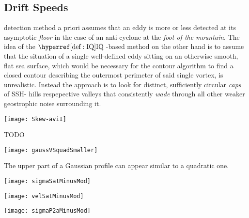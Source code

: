 \subsection{Drift Speeds}

 \MI detection method a priori assumes that an eddy is more or less detected at its asymptotic \textit{floor} \ie in the case of an anti-cyclone at the \textit{foot of the mountain}. The idea of the $\IQ$-based method on the other hand is to assume that the situation of a single well-defined eddy sitting on an otherwise smooth, flat sea surface, which would be necessary for the contour algorithm to find a closed contour describing the outermost perimeter of said single vortex, is unrealistic. Instead the approach is to look for distinct, sufficiently circular \textit{caps} of SSH- hills respepective valleys that consistently \textit{wade} through all other weaker geostrophic noise surrounding it. 


\begin{marginfigure}
		\texttt{[image: Skew-aviI]}
		\caption{TODO}
		\label{fig:SkewAviI}
\end{marginfigure}

\begin{marginfigure}
\texttt{[image: gaussVSquadSmaller]}
\caption{The upper part of a Gaussian profile can appear similar to a quadratic one.}
\label{fig:gaussVSquad}
\end{marginfigure}

\begin{marginfigure}
	\texttt{[image: sigmaSatMinusMod]}
	\caption{}
	\label{fig:TODO}
\end{marginfigure}
\begin{marginfigure}
	\texttt{[image: velSatMinusMod]}
	\caption{}
	\label{fig:TODO}
\end{marginfigure}
\begin{marginfigure}
	\texttt{[image: sigmaP2aMinusMod]}
	\caption{}
	\label{fig:TODO}
\end{marginfigure}
